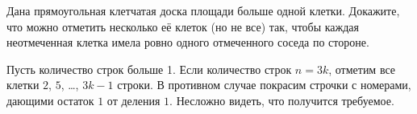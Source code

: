 \problem
Дана прямоугольная клетчатая доска площади больше одной клетки.
Докажите, что можно отметить несколько её клеток (но не все) так, чтобы каждая
неотмеченная клетка имела ровно одного отмеченного соседа по стороне.

\solution
Пусть количество строк больше 1.
Если количество строк $n = 3 k$, отметим все клетки
$2$, $5$, \ldots, $3 k - 1$ строки.
В противном случае покрасим строчки с номерами, дающими остаток $1$ от деления
$1$.
Несложно видеть, что получится требуемое.

\endproblem
